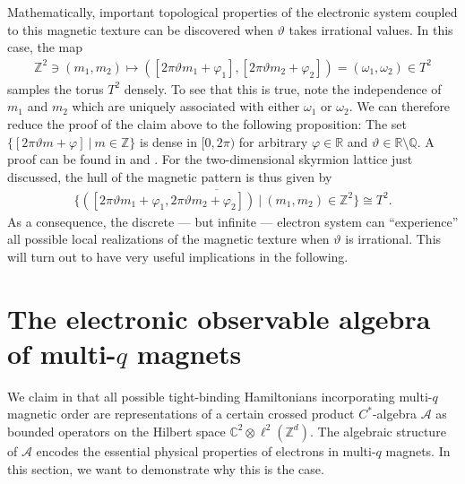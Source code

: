 \documentclass[submission, Phys]{SciPost}
\begin{document}
\figureII

Mathematically, important topological properties of the electronic system coupled to this magnetic texture can be discovered when $\vartheta$ takes irrational values.
In this case, the map
\begin{align}
   \mathbb{Z}^2 \ni (m_1,m_2) \mapsto ( [2\pi \vartheta m_1 + \varphi_1], [2\pi\vartheta m_2 + \varphi_2] ) = (\omega_1, \omega_2) \in T^2
\end{align}
samples the torus $T^2$ densely. 
To see that this is true, note the independence of $m_1$ and $m_2$ which are uniquely associated with either $\omega_1$ or $\omega_2$.
We can therefore reduce the proof of the claim above to the following proposition:
The set $\lbrace [2\pi \vartheta m + \varphi] ~|~ m \in \mathbb{Z}\rbrace$ is dense in $[0,2\pi)$ for arbitrary $\varphi \in \mathbb{R}$ and $\vartheta \in \mathbb{R}\setminus \mathbb{Q}$.
A proof can be found in \cite{Weyl1916} and \cite[Prop. 1.3.3.]{Katok1995}.
For the two-dimensional skyrmion lattice just discussed, the hull of the magnetic pattern is thus given by
\begin{align}
    \overline{
    \lbrace 
        ( [2\pi\vartheta m_1 + \varphi_1, 2\pi \vartheta m_2 + \varphi_2] )
        ~ | ~ (m_1, m_2) \in \mathbb{Z}^2
    \rbrace
    }
    \cong T^2.
\end{align}
As a consequence, the discrete --- but infinite --- electron system can ``experience'' all possible local realizations of the magnetic texture when $\vartheta$ is irrational.
This will turn out to have very useful implications in the following.

\section{The electronic observable algebra of multi-\texorpdfstring{$q$}{q} magnets}
\label{sec:observable_algebra}

We claim in \cite{Lux2024} that all possible tight-binding Hamiltonians incorporating multi-$q$ magnetic order are representations of a certain crossed product $C^\ast$-algebra
$\mathcal{A}$ as bounded operators on the Hilbert space $\mathbb{C}^2 \otimes \ell^2(\mathbb{Z}^d)$.
The algebraic structure of $\mathcal{A}$ encodes the essential physical properties of electrons in multi-$q$ magnets. 
In this section, we want to demonstrate why this is the case.
\end{document}
